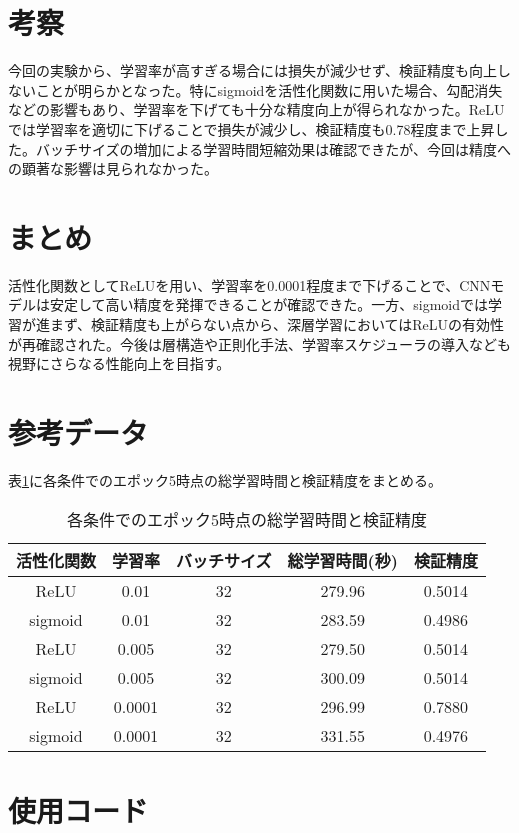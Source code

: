 \documentclass{ltjsarticle}
\begin{document}
\section{考察}
今回の実験から、学習率が高すぎる場合には損失が減少せず、検証精度も向上しないことが明らかとなった。特にsigmoidを活性化関数に用いた場合、勾配消失などの影響もあり、学習率を下げても十分な精度向上が得られなかった。ReLUでは学習率を適切に下げることで損失が減少し、検証精度も0.78程度まで上昇した。バッチサイズの増加による学習時間短縮効果は確認できたが、今回は精度への顕著な影響は見られなかった。

\section{まとめ}
活性化関数としてReLUを用い、学習率を0.0001程度まで下げることで、CNNモデルは安定して高い精度を発揮できることが確認できた。一方、sigmoidでは学習が進まず、検証精度も上がらない点から、深層学習においてはReLUの有効性が再確認された。今後は層構造や正則化手法、学習率スケジューラの導入なども視野にさらなる性能向上を目指す。

\section{参考データ}
表\ref{tab:result}に各条件でのエポック5時点の総学習時間と検証精度をまとめる。

\begin{table}[h]
\centering
\begin{tabular}{|c|c|c|c|c|}
\hline
活性化関数 & 学習率 & バッチサイズ & 総学習時間(秒) & 検証精度 \\
\hline
ReLU & 0.01   & 32 & 279.96 & 0.5014 \\
sigmoid & 0.01   & 32 & 283.59 & 0.4986 \\
ReLU & 0.005  & 32 & 279.50 & 0.5014 \\
sigmoid & 0.005  & 32 & 300.09 & 0.5014 \\
ReLU & 0.0001 & 32 & 296.99 & 0.7880 \\
sigmoid & 0.0001 & 32 & 331.55 & 0.4976 \\
\hline
\end{tabular}
\caption{各条件でのエポック5時点の総学習時間と検証精度}
\label{tab:result}
\end{table}

\section{使用コード}\label{sec:code}





\end{document}
